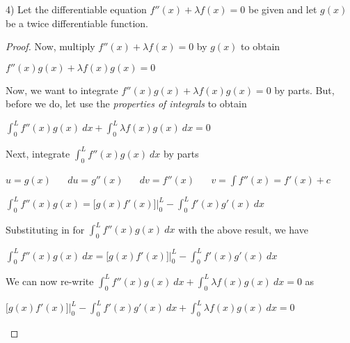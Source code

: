 \documentclass[executivepaper]{article}
\begin{document}
\begin{flushleft}

4) Let the differentiable equation $f''(x)+\lambda f(x)=0$ be given and let $g(x)$ be a twice differentiable function. \\ 

\begin{proof}

Now, multiply $f''(x)+\lambda f(x)=0$ by $g(x)$ to obtain

\begin{center}

$f''(x)g(x)+\lambda f(x)g(x)=0$

\end{center}

Now, we want to integrate $f''(x)g(x)+\lambda f(x)g(x)=0$ by parts. But, before we do, let use the \textit{properties of integrals} to obtain

\begin{center}

$\int_{0}^{L} f''(x)g(x) \ dx + \int_{0}^{L} \lambda f(x)g(x) \ dx=0$

\end{center}

Next, integrate $\int_{0}^{L} f''(x)g(x) \ dx$ by parts

\begin{center}

$u=g(x)$ $\quad$ $du=g''(x)$ $\quad$ $dv=f''(x)$ $\quad$ $v=\int f''(x)=f'(x)+c$

\vspace{2mm}

$\int_{0}^{L} f''(x)g(x)= \bigg[g(x)f'(x)\bigg] \bigg|_{0}^{L} - \int_{0}^{L} f'(x)g'(x) \ dx$

\end{center}

Substituting in for $\int_{0}^{L} f''(x)g(x) \ dx$ with the above result, we have

\begin{center}

$\int_{0}^{L} f''(x)g(x) \ dx=\bigg[g(x)f'(x)\bigg] \bigg|_{0}^{L} - \int_{0}^{L} f'(x)g'(x) \ dx$

\end{center}

We can now re-write $\int_{0}^{L} f''(x)g(x) \ dx + \int_{0}^{L} \lambda f(x)g(x) \ dx=0$ as

\begin{center}

$\bigg[g(x)f'(x)\bigg] \bigg|_{0}^{L} - \int_{0}^{L} f'(x)g'(x) \ dx + \int_{0}^{L} \lambda f(x)g(x) \ dx=0$


\end{center}
\end{proof}
\end{flushleft}
\end{document}
